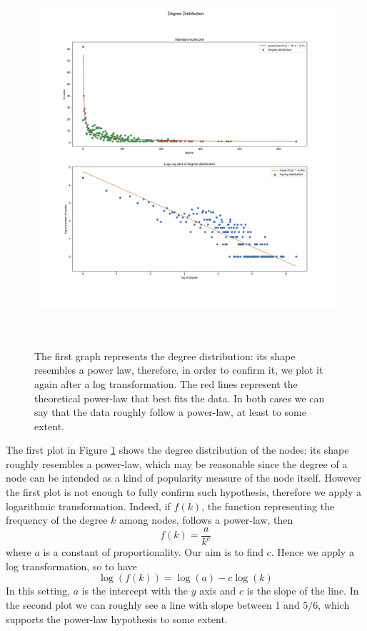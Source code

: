 \documentclass{report}
\theoremstyle{definition}
\theoremstyle{remark}
\begin{document}
\begin{figure} [H]
	\centering
	\centerline{\includegraphics[width = 18cm, height = 14cm, keepaspectratio]{degree_distribution_fit.png}}
	\caption{The first graph represents the degree distribution: its shape resembles a power law, therefore, in order to confirm it, we plot it again after a log transformation. The red lines represent the theoretical power-law that best fits the data. In both cases we can say that the data roughly follow a power-law, at least to some extent.} \label{fig:DegDistMail}
\end{figure}

The first plot in Figure \ref{fig:DegDistMail} shows the degree distribution of the nodes: its shape roughly resembles a power-law, which may be reasonable since the degree of a node can be intended as a kind of popularity measure of the node itself. However the first plot is not enough to fully confirm such hypothesis, therefore we apply a logarithmic transformation. Indeed, if $f(k)$, the function representing the frequency of the degree $k$ among nodes, follows a power-law, then
\begin{equation*}
f(k)  = \frac{a}{k^c}
\end{equation*}
where $a$ is a constant of proportionality. Our aim is to find $c$. Hence we apply a log transformation, so to have
\begin{equation*}
\log(f(k)) = \log(a) -c \log(k)
\end{equation*}
In this setting, $a$ is the intercept with the $y$ axis and $c$ is the slope of the line. In the second plot we can roughly see a line with slope between 1 and $5/6$, which supports the power-law hypothesis to some extent.
\end{document}
